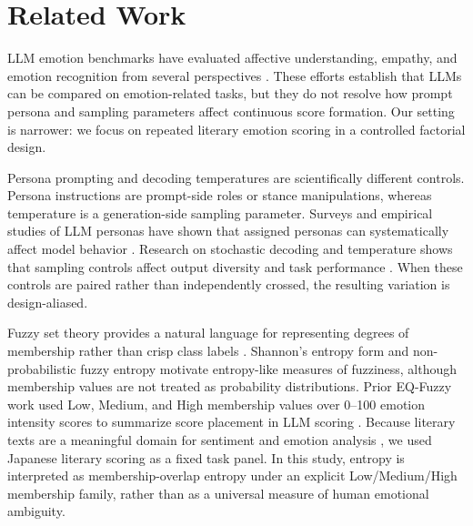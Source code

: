 \documentclass[conference]{IEEEtran}
\begin{document}
\section{Related Work}
LLM emotion benchmarks have evaluated affective understanding, empathy, and emotion recognition from several perspectives \cite{sabour2024emobench, paech2024eqbench}.
These efforts establish that LLMs can be compared on emotion-related tasks, but they do not resolve how prompt persona and sampling parameters affect continuous score formation.
Our setting is narrower: we focus on repeated literary emotion scoring in a controlled factorial design.

Persona prompting and decoding temperatures are scientifically different controls.
Persona instructions are prompt-side roles or stance manipulations, whereas temperature is a generation-side sampling parameter.
Surveys and empirical studies of LLM personas have shown that assigned personas can systematically affect model behavior \cite{tseng2024personaSurvey,jiang2024personallm}.
Research on stochastic decoding and temperature shows that sampling controls affect output diversity and task performance \cite{holtzman2020curious,renze2024temperature}.
When these controls are paired rather than independently crossed, the resulting variation is design-aliased.

Fuzzy set theory provides a natural language for representing degrees of membership rather than crisp class labels \cite{zadeh1965fuzzy}.
Shannon's entropy form \cite{shannon1948} and non-probabilistic fuzzy entropy \cite{deluca1972nonprobabilistic} motivate entropy-like measures of fuzziness, although membership values are not treated as probability distributions.
Prior EQ-Fuzzy work used Low, Medium, and High membership values over 0--100 emotion intensity scores to summarize score placement in LLM scoring \cite{shirahama2026mdpi}.
Because literary texts are a meaningful domain for sentiment and emotion analysis \cite{kim2019literaryEmotion}, we used Japanese literary scoring as a fixed task panel.
In this study, entropy is interpreted as membership-overlap entropy under an explicit Low/Medium/High membership family, rather than as a universal measure of human emotional ambiguity.
\end{document}
